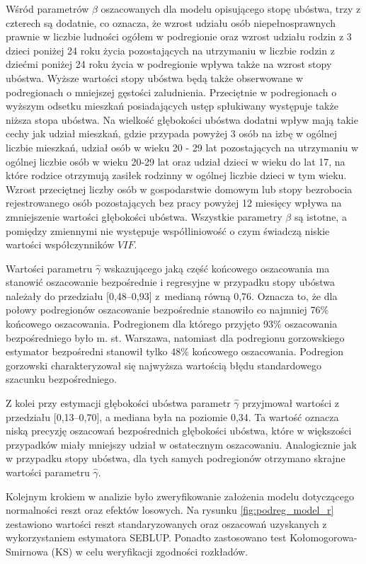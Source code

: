 Wśród parametrów $\beta$ oszacowanych dla modelu opisującego stopę ubóstwa, trzy z czterech są dodatnie, co oznacza, że wzrost udziału osób niepełnosprawnych prawnie w liczbie ludności ogółem w podregionie oraz wzrost udziału rodzin z 3 dzieci poniżej 24 roku życia pozostających na utrzymaniu w liczbie rodzin z dziećmi poniżej 24 roku życia w podregionie wpływa także na wzrost stopy ubóstwa. Wyższe wartości stopy ubóstwa będą także obserwowane w podregionach o mniejszej gęstości zaludnienia. Przeciętnie w podregionach o wyższym odsetku mieszkań posiadających ustęp spłukiwany występuje także niższa stopa ubóstwa. Na wielkość głębokości ubóstwa dodatni wpływ mają takie cechy jak udział mieszkań, gdzie przypada powyżej 3 osób na izbę w ogólnej liczbie mieszkań, udział osób w wieku 20 - 29 lat pozostających na utrzymaniu w ogólnej liczbie osób w wieku 20-29 lat oraz udział dzieci w wieku do lat 17, na które rodzice otrzymują zasiłek rodzinny w ogólnej liczbie dzieci w tym wieku. Wzrost przeciętnej liczby osób w gospodarstwie domowym lub stopy bezrobocia rejestrowanego osób pozostających bez pracy powyżej 12 miesięcy wpływa na zmniejszenie wartości głębokości ubóstwa. Wszystkie parametry $\beta$ są istotne, a pomiędzy zmiennymi nie występuje współliniowość o czym świadczą niskie wartości współczynników $VIF$.

Wartości parametru $\hat{\gamma}$ wskazującego jaką część końcowego oszacowania ma stanowić oszacowanie bezpośrednie i regresyjne w przypadku stopy ubóstwa należały do przedziału {[}0,48--0,93{]} z~medianą równą 0,76. Oznacza to, że dla połowy podregionów oszacowanie bezpośrednie stanowiło co najmniej 76\% końcowego oszacowania. Podregionem dla którego przyjęto 93\% oszacowania bezpośredniego było m. st. Warszawa, natomiast dla podregionu gorzowskiego estymator bezpośredni stanowił tylko 48\% końcowego oszacowania. Podregion gorzowski charakteryzował się najwyższa wartością błędu standardowego szacunku bezpośredniego. 

Z kolei przy estymacji głębokości ubóstwa parametr $\hat{\gamma}$ przyjmował wartości z przedziału {[}0,13--0,70{]}, a mediana była na poziomie 0,34. Ta wartość oznacza niską precyzję oszacowań bezpośrednich głębokości ubóstwa, które w większości przypadków miały mniejszy udział w ostatecznym oszacowaniu. Analogicznie jak w przypadku stopy ubóstwa, dla tych samych podregionów otrzymano skrajne wartości parametru $\hat{\gamma}$.

Kolejnym krokiem w analizie było zweryfikowanie założenia modelu dotyczącego normalności reszt oraz efektów losowych. Na rysunku \ref{fig:podreg_model_r} zestawiono wartości reszt standaryzowanych oraz oszacowań uzyskanych z wykorzystaniem estymatora SEBLUP. Ponadto zastosowano test Kołomogorowa-Smirnowa (KS) w celu weryfikacji zgodności rozkładów.

